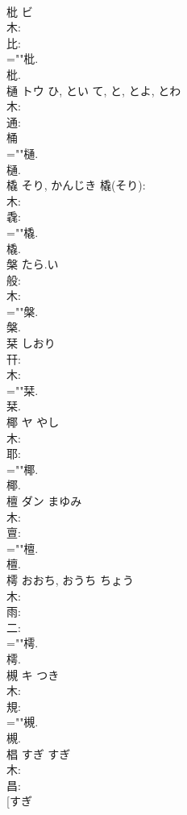 \documentclass[8pt]{extreport}
\begin{document}
\begin{CJK}{UTF8}{min}
\\	枇	ビ			
\\	木: 
\\	比: 
\\	=""枇.
\\	枇.
\\	樋	トウ	ひ, とい	て, と, とよ, とわ	
\\	木: 
\\	通: 
\\	桶 
\\	=""樋.
\\	樋.
\\	橇		そり, かんじき			橇(そり): 
\\	木: 
\\	毳: 
\\	=""橇.
\\	橇.
\\	槃		たら.い				
\\	般: 
\\	木: 
\\	=""槃.
\\	槃.
\\	栞		しおり				
\\	幵: 
\\	木: 
\\	=""栞.
\\	栞.
\\	椰	ヤ	やし		
\\	木: 
\\	耶: 
\\	=""椰.
\\	椰.
\\	檀	ダン	まゆみ		
\\	木: 
\\	亶: 
\\	=""檀.
\\	檀.
\\	樗		おおち, おうち	ちょう			
\\	木: 
\\	雨: 
\\	二: 
\\	=""樗.
\\	樗.
\\	槻	キ	つき		
\\	木: 
\\	規: 
\\	=""槻.
\\	槻.
\\	椙	すぎ	すぎ		
\\	木: 
\\	昌: 
\\	[すぎ 

\end{CJK}
\end{document}
